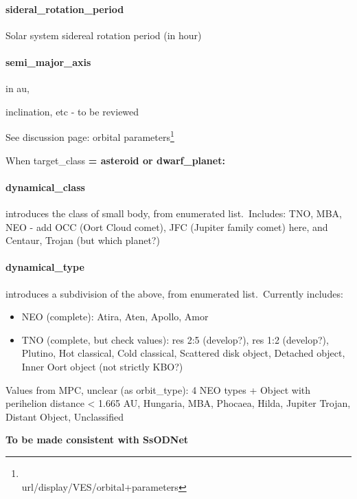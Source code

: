 \documentclass[11pt,a4paper]{ivoa}
\begin{document}
\paragraph{sideral\_rotation\_period}

Solar system sidereal rotation period (in hour)

\paragraph{semi\_major\_axis}

in au,

inclination, etc - to be reviewed

See discussion page: orbital parameters\footnote{\\url{/display/VES/orbital+parameters}}

When target\_class\textbf{ = asteroid or dwarf\_planet:\\}

\paragraph{dynamical\_class}

introduces the class of small body, from enumerated list. Includes: TNO, MBA, NEO - add OCC (Oort Cloud comet), JFC (Jupiter family comet) here, and Centaur, Trojan (but which planet?)

\paragraph{dynamical\_type}

introduces a subdivision of the above, from enumerated list. Currently includes:

\begin{itemize}
\item NEO (complete): Atira, Aten, Apollo, Amor
\item TNO (complete, but check values): res 2:5 (develop?), res 1:2 (develop?), Plutino, Hot classical, Cold classical, Scattered disk object, Detached object, Inner Oort object (not strictly KBO?)
\end{itemize}

Values from MPC, unclear (as orbit\_type): 4 NEO types + Object with perihelion distance < 1.665 AU, Hungaria, MBA, Phocaea, Hilda, Jupiter Trojan, Distant Object, Unclassified

\textbf{To be made consistent with SsODNet\emph{\\}}
\end{document}
